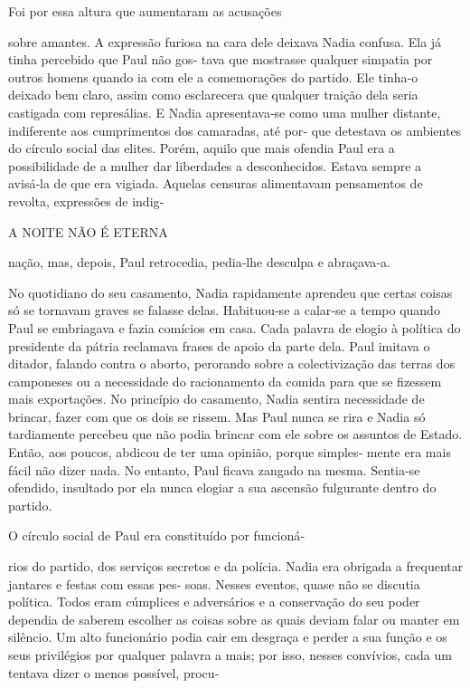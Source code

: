 Foi por essa altura que aumentaram as acusações

sobre amantes. A expressão furiosa na cara dele deixava Nadia confusa.
Ela já tinha percebido que Paul não gos‑ tava que mostrasse qualquer
simpatia por outros homens quando ia com ele a comemorações do partido.
Ele tinha‑o deixado bem claro, assim como esclarecera que qualquer
traição dela seria castigada com represálias. E Nadia apresentava‑se
como uma mulher distante, indiferente aos cumprimentos dos camaradas,
até por‑ que detestava os ambientes do círculo social das elites. Porém,
aquilo que mais ofendia Paul era a possibilidade de a mulher dar
liberdades a desconhecidos. Estava sempre a avisá‑la de que era vigiada.
Aquelas censuras alimentavam pensamentos de revolta, expressões de
indig‑

A NOITE NÃO É ETERNA

nação, mas, depois, Paul retrocedia, pedia‑lhe desculpa e abraçava‑a.

No quotidiano do seu casamento, Nadia rapidamente aprendeu que certas
coisas só se tornavam graves se falasse delas. Habituou‑se a calar‑se a
tempo quando Paul se embriagava e fazia comícios em casa. Cada palavra
de elogio à política do presidente da pátria reclamava frases de apoio
da parte dela. Paul imitava o ditador, falando contra o aborto,
perorando sobre a colectivização das terras dos camponeses ou a
necessidade do racionamento da comida para que se fizessem mais
exportações. No princípio do casamento, Nadia sentira necessidade de
brincar, fazer com que os dois se rissem. Mas Paul nunca se rira e Nadia
só tardiamente percebeu que não podia brincar com ele sobre os assuntos
de Estado. Então, aos poucos, abdicou de ter uma opinião, porque
simples‑ mente era mais fácil não dizer nada. No entanto, Paul ficava
zangado na mesma. Sentia‑se ofendido, insultado por ela nunca elogiar a
sua ascensão fulgurante dentro do partido.

O círculo social de Paul era constituído por funcioná‑

rios do partido, dos serviços secretos e da polícia. Nadia era obrigada
a frequentar jantares e festas com essas pes‑ soas. Nesses eventos,
quase não se discutia política. Todos eram cúmplices e adversários e a
conservação do seu poder dependia de saberem escolher as coisas sobre as
quais deviam falar ou manter em silêncio. Um alto funcionário podia cair
em desgraça e perder a sua função e os seus privilégios por qualquer
palavra a mais; por isso, nesses convívios, cada um tentava dizer o
menos possível, procu‑

